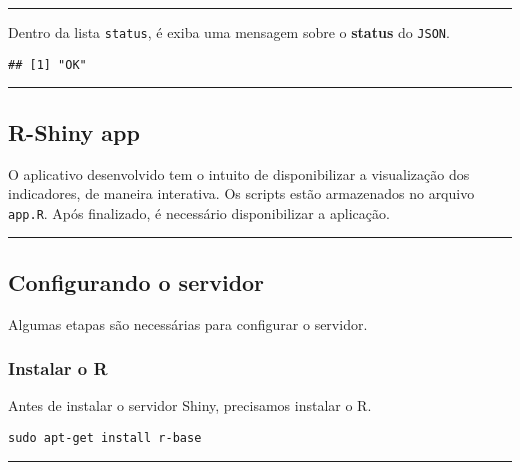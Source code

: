 \documentclass[
]{article}
\newenvironment{Shaded}{\begin{snugshade}}{\end{snugshade}}
\newcommand{\NormalTok}[1]{#1}
\newcommand{\SpecialCharTok}[1]{\textcolor[rgb]{0.00,0.00,0.00}{#1}}
\begin{document}
\begin{center}\rule{0.5\linewidth}{0.5pt}\end{center}

Dentro da lista \texttt{status}, é exiba uma mensagem sobre o
\textbf{status} do \texttt{JSON}.

\begin{Shaded}
\end{Shaded}

\begin{verbatim}
## [1] "OK"
\end{verbatim}

\begin{center}\rule{0.5\linewidth}{0.5pt}\end{center}

\hypertarget{r-shiny-app}{%
\subsection{R-Shiny app}\label{r-shiny-app}}

O aplicativo desenvolvido tem o intuito de disponibilizar a visualização
dos indicadores, de maneira interativa. Os scripts estão armazenados no
arquivo \texttt{app.R}. Após finalizado, é necessário disponibilizar a
aplicação.

\begin{center}\rule{0.5\linewidth}{0.5pt}\end{center}

\hypertarget{configurando-o-servidor}{%
\subsection{Configurando o servidor}\label{configurando-o-servidor}}

Algumas etapas são necessárias para configurar o servidor.

\hypertarget{instalar-o-r}{%
\subsubsection{Instalar o R}\label{instalar-o-r}}

Antes de instalar o servidor Shiny, precisamos instalar o R.

\texttt{sudo\ apt-get\ install\ r-base}

\begin{center}\rule{0.5\linewidth}{0.5pt}\end{center}
\end{document}
